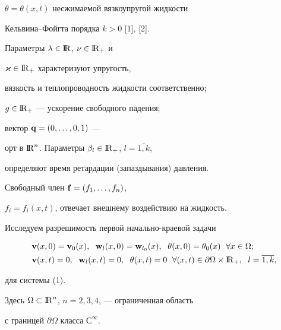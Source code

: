 $\theta=\theta (x,t)$ несжимаемой вязкоупругой жидкости


Кельвина--Фойгта порядка $k>0$ [1], [2].


Параметры $\lambda \in {\mathrm I}\!{\mathrm R}$, $\nu \in {{\mathrm I}\!{\mathrm R}}_+$ и


$\varkappa \in {{\mathrm I}\!{\mathrm R}}_+$ характеризуют упругость,


вязкость и теплопроводность жидкости соответственно;


$g \in {{\mathrm I}\!{\mathrm R}}_+$ --- ускорение свободного падения;


вектор ${\bold q}=(0,\dotsc,0,1)$ --- 


орт в ${{\mathrm I}\!{\mathrm R}}^n$. Параметры ${\beta}_l \in {{\mathrm I}\!{\mathrm R}}_+$, $l=\overline{1,k}$,


определяют время ретардации (запаздывания) давления.


Свободный член ${\bold f}=(f_1, \dotsc, f_n)$,


$f_i=f_i(x,t)$, отвечает внешнему воздействию на жидкость.





Исследуем разрешимость первой начально-краевой задачи


\begin{equation}


\begin{split}


&{\bold v}(x,0)={\bold v}_0(x),\ \;


{\bold w}_l(x,0)={\bold w}_{l_0}(x), \ \;


\theta (x,0)={\theta}_0(x) \ \;


\forall x \in \Omega ;\\


%


&{\bold v}(x,t)=0,\ \;


{\bold w}_l(x,t)=0, \ \;


\theta (x,t)=0 \ \;


\forall (x,t) \in \partial \Omega \times {\R}_+, \ \;l=\overline {1,k},


\end{split}


\end{equation}


для системы (1).


Здесь $\Omega \subset {{\mathrm I}\!{\mathrm R}}^n$, $n=2,3,4$, --- ограниченная область


с границей $\partial \Omega$ класса $С^{\infty}.$





